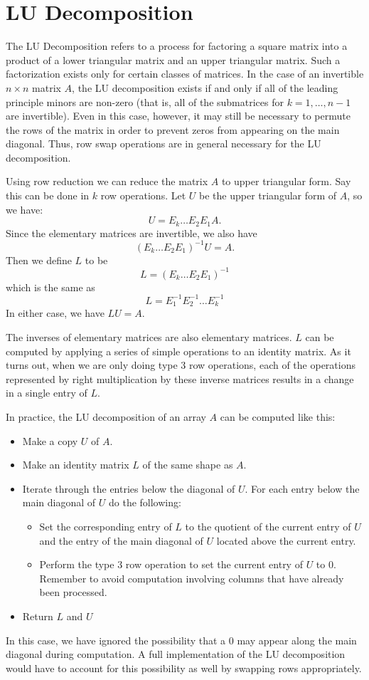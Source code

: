 \section*{LU Decomposition}
The LU Decomposition refers to a process for factoring a square matrix into
a product of a lower triangular matrix and an upper triangular matrix. Such
a factorization exists only for certain classes of matrices. In the case
of an invertible $n \times n$ matrix $A$, the LU decomposition exists if and only if all
of the leading principle minors are non-zero (that is, all of the
submatrices  for $k = 1,\ldots,n-1$ are invertible). Even in
this case, however, it may still be necessary to permute the rows of the
matrix in order to prevent zeros from appearing on the main diagonal. Thus,
row swap operations are in general necessary for the LU decomposition.

Using row reduction we can reduce the matrix $A$ to upper triangular form.
Say this can be done in $k$ row operations.
Let $U$ be the upper triangular form of $A$, so we have:
\[
U = E_k \dots E_2 E_1 A.
\]
Since the elementary matrices are invertible, we also have
\[
(E_k \dots E_2 E_1)^{-1} U =  A.
\]
Then we define $L$ to be
\[
L = (E_k \dots E_2 E_1)^{-1}
\]
which is the same as
\[
L = E_1^{-1} E_2^{-1} \dots E_k^{-1}
\]
In either case, we have $L U = A$.

The inverses of elementary matrices are also elementary matrices. $L$ can be computed by applying a series of simple operations to an identity matrix.
As it turns out, when we are only doing type 3 row operations, each of the operations represented by right multiplication by these inverse matrices results in a change in a single entry of $L$.

In practice, the LU decomposition of an array $A$ can be computed like this:
\begin{itemize}
\item Make a copy $U$ of $A$.
\item Make an identity matrix $L$ of the same shape as $A$.
\item Iterate through the entries below the diagonal of $U$.
For each entry below the main diagonal of $U$ do the following:
	\begin{itemize}
	\item Set the corresponding entry of $L$ to the quotient of the current entry of $U$ and the entry of the main diagonal of $U$ located above the current entry.
	\item Perform the type 3 row operation to set the current entry of $U$ to 0.
		Remember to avoid computation involving columns that have already been processed.
	\end{itemize}
\item Return $L$ and $U$
\end{itemize}
In this case, we have ignored the possibility that a 0 may appear along the main diagonal during computation.
A full implementation of the LU decomposition would have to account for this possibility as well by swapping rows appropriately.

